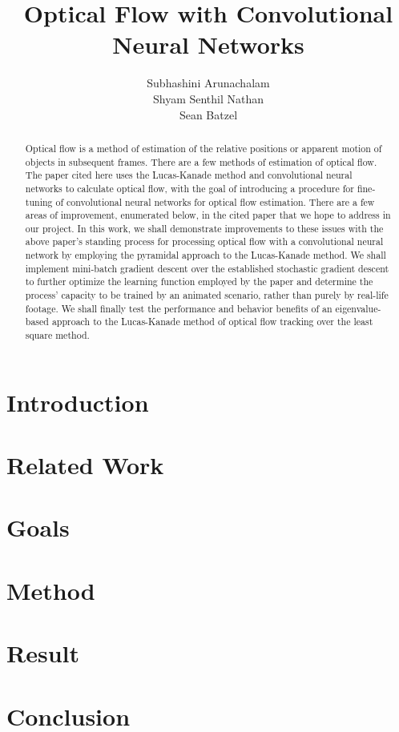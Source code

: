 \documentclass[]{article}
\title{Optical Flow with Convolutional Neural Networks}
\author{Subhashini Arunachalam\\Shyam Senthil Nathan\\Sean Batzel}
\begin{document}
\maketitle

\nocite{*}

\pagebreak
\begin{abstract}
    Optical flow is a method of estimation of the relative positions or apparent motion of objects in
    subsequent frames. There are a few methods of estimation of optical flow. The paper cited here uses the
    Lucas-Kanade method and convolutional neural networks to calculate optical flow, with the goal of
    introducing a procedure for fine-tuning of convolutional neural networks for optical flow estimation.
    There are a few areas of improvement, enumerated below, in the cited paper that we hope to address in
    our project. In this work, we shall demonstrate improvements to these issues with the above paper’s
    standing process for processing optical flow with a convolutional neural network by employing the
    pyramidal approach to the Lucas-Kanade method. We shall implement mini-batch gradient descent over
    the established stochastic gradient descent to further optimize the learning function employed by the
    paper and determine the process’ capacity to be trained by an animated scenario, rather than purely by
    real-life footage. We shall finally test the performance and behavior benefits of an eigenvalue-based
    approach to the Lucas-Kanade method of optical flow tracking over the least square method.
\end{abstract}

\section{Introduction}

\section{Related Work}

\section{Goals}

\section{Method}

\section{Result}

\section{Conclusion}

\pagebreak
\listoftables
\listoffigures
\printbibliography[heading=bibintoc]{}
\end{document}
